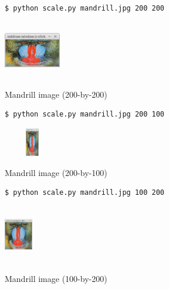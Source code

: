 \documentclass[8pt,a4paper,compress,handout]{beamer}
\begin{document}
\begin{frame}[fragile]
\begin{minipage}{200pt}
\begin{lstlisting}[language={}]
$ python scale.py mandrill.jpg 200 200
\end{lstlisting}
\end{minipage}%
\hfill
\begin{minipage}{100pt}
\begin{center}
\includegraphics[width=2.5cm,height=2.5cm]{figures/scale2.png}

\smallskip

\tiny Mandrill image (200-by-200)
\end{center}
\end{minipage}%

\bigskip

\begin{minipage}{200pt}
\begin{lstlisting}[language={}]
$ python scale.py mandrill.jpg 200 100
\end{lstlisting}
\end{minipage}%
\hfill
\begin{minipage}{100pt}
\begin{center}
\includegraphics[width=2.5cm,height=1.25cm]{figures/scale3.png}

\smallskip

\tiny Mandrill image (200-by-100)
\end{center}
\end{minipage}%

\bigskip

\begin{minipage}{200pt}
\begin{lstlisting}[language={}]
$ python scale.py mandrill.jpg 100 200
\end{lstlisting}
\end{minipage}%
\hfill
\begin{minipage}{100pt}
\begin{center}
\includegraphics[width=1.25cm,height=2.5cm]{figures/scale1.png}

\smallskip

\tiny Mandrill image (100-by-200)
\end{center}
\end{minipage}%
\end{frame}
\end{document}
